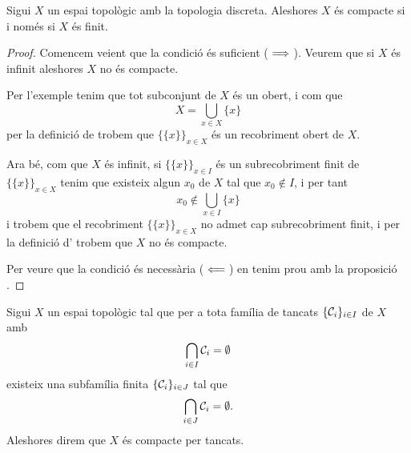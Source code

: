 \documentclass[../Apunts.tex]{subfiles}
\begin{document}
	\begin{proposition}
		\label{prop:un espai topològic discret és compacte si i només si és finit}
		Sigui \(X\) un espai topològic amb la topologia discreta. Aleshores \(X\) és compacte si i només si \(X\) és finit.
		\begin{proof}
			Comencem veient que la condició és suficient (\(\implies\)). Veurem que si \(X\) és infinit aleshores \(X\) no és compacte.
			
			Per l'exemple  tenim que tot subconjunt de \(X\) és un obert, i com que
			\[X=\bigcup_{x\in X}\{x\}\]
			per la definició de  trobem que \(\{\{x\}\}_{x\in X}\) és un recobriment obert de \(X\).
			
			Ara bé, com que \(X\) és infinit, si \(\{\{x\}\}_{x\in I}\) és un subrecobriment finit de \(\{\{x\}\}_{x\in X}\) tenim que existeix algun \(x_{0}\) de \(X\) tal que \(x_{0}\notin I\), i per tant
			\[x_{0}\notin\bigcup_{x\in I}\{x\}\]
			i trobem que el recobriment \(\{\{x\}\}_{x\in X}\) no admet cap subrecobriment finit, i per la definició d' trobem que \(X\) no és compacte.
			
			Per veure que la condició és necessària (\(\impliedby\)) en tenim prou amb la proposició .
		\end{proof}
	\end{proposition}
	\begin{definition}
		\label{def:compacitat per tancats}
		\label{def:compacte per tancats}
		Sigui \(X\) un espai topològic tal que per a tota família de tancats \(\{\mathcal{C}_{i}\}_{i\in I}\) de \(X\) amb
		\[\bigcap_{i\in I}\mathcal{C}_{i}=\emptyset\]
		existeix una subfamília finita \(\{\mathcal{C}_{i}\}_{i\in J}\) tal que
		\[\bigcap_{i\in J}\mathcal{C}_{i}=\emptyset.\]
		Aleshores direm que \(X\) és compacte per tancats.
	\end{definition}
\end{document}

